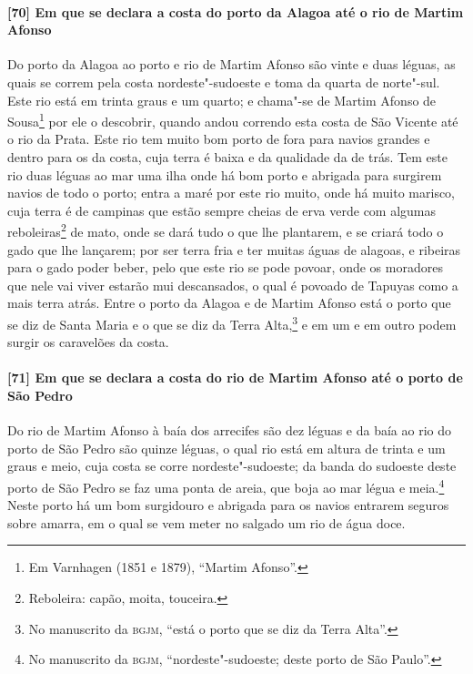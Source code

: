 \paragraph{[70] Em que se declara a costa do porto da Alagoa até o rio de Martim Afonso} \quad
Do porto da Alagoa ao porto e rio de Martim Afonso são vinte e duas léguas, as quais se
correm pela costa nordeste"-sudoeste e toma da quarta de norte"-sul. Este rio está em trinta
graus e um quarto; e chama"-se de Martim Afonso de Sousa\footnote{ Em Varnhagen (1851 e
1879), ``Martim Afonso''.} por ele o descobrir, quando andou correndo esta costa de São
Vicente até o rio da Prata. Este rio tem muito bom porto de fora para navios grandes e
dentro para os da costa, cuja terra é baixa e da qualidade da de trás. Tem este rio duas
léguas ao mar uma ilha onde há bom porto e abrigada para surgirem navios de todo o porto;
entra a maré por este rio muito, onde há muito marisco, cuja terra é de campinas que estão
sempre cheias de erva verde com algumas reboleiras\footnote{ Reboleira: capão, moita,
touceira.} de mato, onde se dará tudo o que lhe plantarem, e se criará todo o gado que lhe
lançarem; por ser terra fria e ter muitas águas de alagoas, e ribeiras para o gado poder
beber, pelo que este rio se pode povoar, onde os moradores que nele vai viver estarão mui
descansados, o qual é povoado de Tapuyas como a mais terra atrás. Entre o porto da Alagoa
e de Martim Afonso está o porto que se diz de Santa Maria e o que se diz da Terra
Alta,\footnote{ No manuscrito da \textsc{bgjm}, ``está o porto que se diz da Terra
Alta''.} e em um e em outro podem surgir os caravelões da costa.

\paragraph{[71] Em que se declara a costa do rio de Martim Afonso até o porto de São Pedro} \quad
Do rio de Martim Afonso à baía dos arrecifes são dez léguas e da baía ao rio do porto de
São Pedro são quinze léguas, o qual rio está em altura de trinta e um graus e meio, cuja
costa se corre nordeste"-sudoeste; da banda do sudoeste deste porto de São Pedro se faz uma
ponta de areia, que boja ao mar légua e meia.\footnote{ No manuscrito da \textsc{bgjm},
``nordeste"-sudoeste; deste porto de São Paulo''.} Neste porto há um bom surgidouro e
abrigada para os navios entrarem seguros sobre amarra, em o qual se vem meter no salgado
um rio de água doce.

